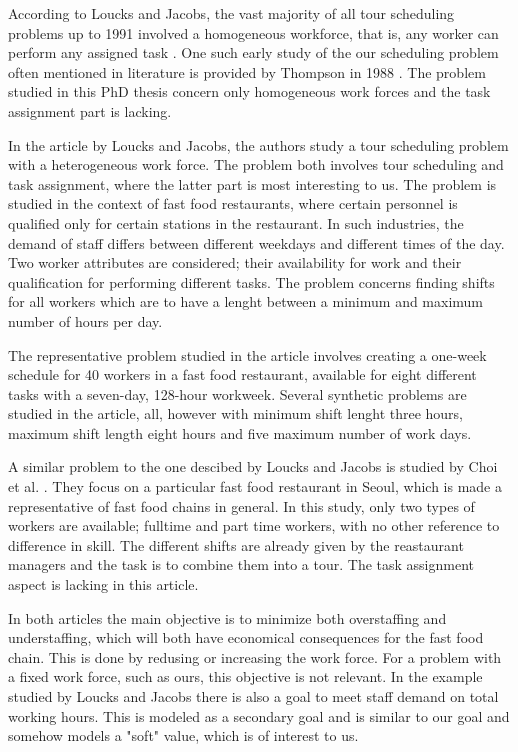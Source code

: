 According to Loucks and Jacobs, the vast majority of all tour scheduling problems up to 1991 involved a homogeneous workforce, that is, any worker can perform any assigned task \cite{loucks_1991}. One such early study of the our scheduling problem often mentioned in literature is provided by Thompson in 1988 \cite{thompson_1988}. The problem studied in this PhD thesis concern only homogeneous work forces and the task assignment part is lacking.


In the article by Loucks and Jacobs, the authors study a tour scheduling problem with a heterogeneous work force. The problem both involves tour scheduling and task assignment, where the latter part is most interesting to us. The problem is studied in the context of fast food restaurants, where certain personnel is qualified only for certain stations in the restaurant. In such industries, the demand of staff differs between different weekdays and different times of the day. Two worker attributes are considered; their availability for work and their qualification for performing different tasks. The problem concerns finding shifts for all workers which are to have a lenght between a minimum and maximum number of hours per day.

The representative problem studied in the article involves creating a one-week schedule for 40 workers in a fast food restaurant, available for eight different tasks with a seven-day, 128-hour workweek. Several synthetic problems are studied in the article, all, however with minimum shift lenght three hours, maximum shift length eight hours and five maximum number of work days.

A similar problem to the one descibed by Loucks and Jacobs is studied by Choi et al. \cite{choi_hwang_park_2009}. They focus on a particular fast food restaurant in Seoul, which is made a representative of fast food chains in general. In this study, only two types of workers are available; fulltime and part time workers, with no other reference to difference in skill. The different shifts are already given by the reastaurant managers and the task is to combine them into a tour. The task assignment aspect is lacking in this article.


In both articles the main objective is to minimize both overstaffing and understaffing, which will both have economical consequences for the fast food chain. This is done by redusing or increasing the work force. For a problem with a fixed work force, such as ours, this objective is not relevant. In the example studied by Loucks and Jacobs there is also a goal to meet staff demand on total working hours. This is modeled as a secondary goal and is similar to our goal and somehow models a "soft" value, which is of interest to us.

